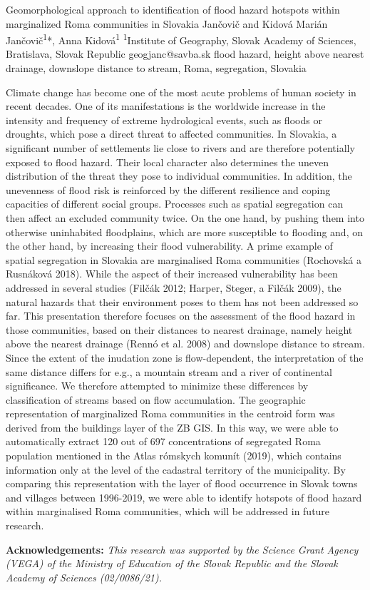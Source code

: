 \abstract
{Geomorphological approach to identification of flood hazard hotspots within marginalized Roma communities in Slovakia} %
{Jančovič and Kidová} %
{Marián Jančovič\textsuperscript{1}*, Anna Kidová\textsuperscript{1}} %
{\TLtag} %
{\textsuperscript{1}Institute of Geography, Slovak Academy of Sciences, Bratislava, Slovak Republic
} %
{geogjanc@savba.sk}  %
{flood hazard, height above nearest drainage, downslope distance to stream, Roma, segregation, Slovakia}%
{Climate change has become one of the most acute problems of human society in recent decades. One of its manifestations is the worldwide increase in the intensity and frequency of extreme hydrological events, such as floods or droughts, which pose a direct threat to affected communities. In Slovakia, a significant number of settlements lie close to rivers and are therefore potentially exposed to flood hazard. Their local character also determines the uneven distribution of the threat they pose to individual communities. In addition, the unevenness of flood risk is reinforced by the different resilience and coping capacities of different social groups. Processes such as spatial segregation can then affect an excluded community twice. On the one hand, by pushing them into otherwise uninhabited floodplains, which are more susceptible to flooding and, on the other hand, by increasing their flood vulnerability. A prime example of spatial segregation in Slovakia are marginalised Roma communities (Rochovská a Rusnáková 2018). While the aspect of their increased vulnerability has been addressed in several studies (Filčák 2012; Harper, Steger, a Filčák 2009), the natural hazards that their environment poses to them has not been addressed so far. This presentation therefore focuses on the assessment of the flood hazard in those communities, based on their distances to nearest drainage, namely height above the nearest drainage (Rennó et al. 2008) and downslope distance to stream. Since the extent of the inudation zone is flow-dependent, the interpretation of the same distance differs for e.g., a mountain stream and a river of continental significance. We therefore attempted to minimize these differences by classification of streams based on flow accumulation. The geographic representation of marginalized Roma communities in the centroid form was derived from the buildings layer of the ZB GIS. In this way, we were able to automatically extract 120 out of 697 concentrations of segregated Roma population mentioned in the Atlas rómskych komunít (2019), which contains information only at the level of the cadastral territory of the municipality. By comparing this representation with the layer of flood occurrence in Slovak towns and villages between 1996-2019, we were able to identify hotspots of flood hazard within marginalised Roma communities, which will be addressed in future research.

\vspace{0.5em}
\noindent
\textbf{Acknowledgements:}	
\textit{This research was supported by the Science Grant Agency (VEGA) of the Ministry of Education of the Slovak Republic and the Slovak Academy of Sciences (02/0086/21).}
}%
